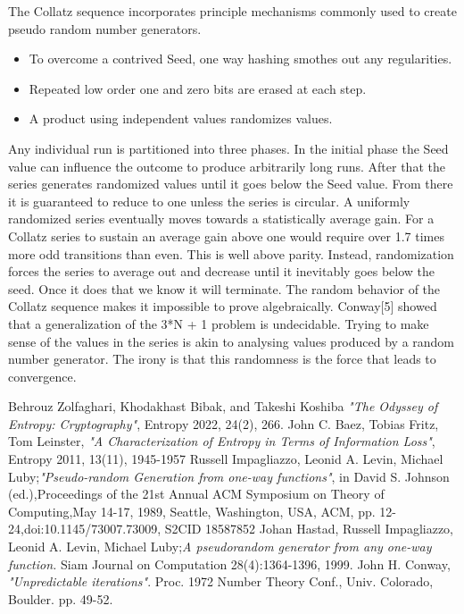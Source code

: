 \documentclass[letterpaper]{article}
\begin{document}
\begin{multicols}{2}
    The Collatz sequence incorporates principle mechanisms commonly used to create pseudo random number generators.

    \begin{itemize}
        \item To overcome a contrived Seed, one way hashing smothes out any regularities.
        \item Repeated low order one and zero bits are erased at each step.
        \item A product using independent values randomizes values.
    \end{itemize}
    Any individual run is partitioned into three phases. In the initial phase the Seed value can influence the outcome to produce arbitrarily long runs. After that the series generates randomized values until it goes below the Seed value. From there it is guaranteed to reduce to one unless the series is circular.
    A uniformly randomized series eventually moves towards a statistically average gain. For a Collatz series to sustain an average gain above one would require over 1.7 times more odd transitions than even. This is well above parity. Instead, randomization forces the series to average out and decrease until it inevitably goes below the seed. Once it does that we know it will terminate.
    The random behavior of the Collatz sequence makes it impossible to prove algebraically. Conway[5] showed that a generalization of the 3*N + 1 problem is undecidable. Trying to make sense of the values in the series is akin to analysing values produced by a random number generator. The irony is that this randomness is the force that leads to convergence.

    \begin{thebibliography}{9}
        Behrouz Zolfaghari, Khodakhast Bibak, and Takeshi Koshiba \emph{"The Odyssey of Entropy: Cryptography"}, Entropy 2022, 24(2), 266.%
        John C. Baez, Tobias Fritz, Tom Leinster, \emph{"A Characterization of Entropy in Terms of Information Loss"}, Entropy 2011, 13(11), 1945-1957%
        Russell Impagliazzo, Leonid A. Levin, Michael Luby;\emph{"Pseudo-random Generation from one-way functions"}, in David S. Johnson (ed.),Proceedings of the 21st Annual ACM Symposium on Theory of Computing,May 14-17, 1989, Seattle, Washington, USA, {ACM}, pp. 12-24,doi:10.1145/73007.73009, S2CID 18587852%
        Johan Hastad, Russell Impagliazzo, Leonid A. Levin, Michael Luby;\emph{A pseudorandom generator from any one-way function.} Siam Journal on Computation 28(4):1364-1396, 1999.%
        John H. Conway, \emph{"Unpredictable iterations"}. Proc. 1972 Number Theory Conf., Univ. Colorado, Boulder. pp. 49-52.
    \end{thebibliography}


\end{multicols}
\end{document}
